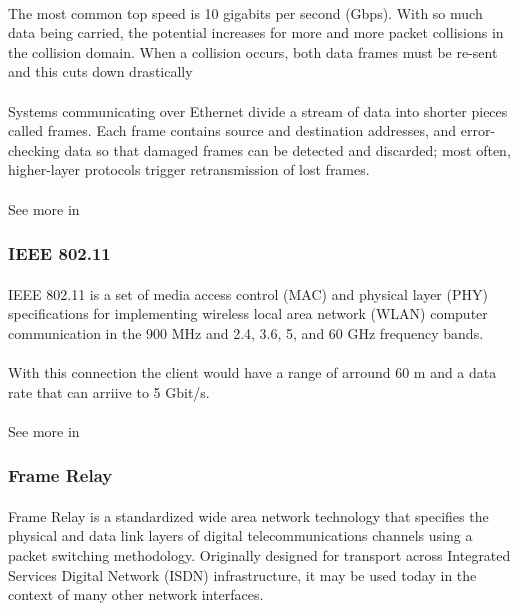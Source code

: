 \paragraph{}
The most common top speed is 10 gigabits per second (Gbps). With so much data being carried, the potential increases for more and more packet collisions in the collision domain. When a collision occurs, both data frames must be re-sent and this cuts down drastically 
\paragraph{}
Systems communicating over Ethernet divide a stream of data into shorter pieces called frames. Each frame contains source and destination addresses, and error-checking data so that damaged frames can be detected and discarded; most often, higher-layer protocols trigger retransmission of lost frames.
\paragraph{}
See more in \cite{Ethernet}

\subsubsection{IEEE 802.11}
\paragraph{}
IEEE 802.11 is a set of media access control (MAC) and physical layer (PHY) specifications for implementing wireless local area network (WLAN) computer communication in the 900 MHz and 2.4, 3.6, 5, and 60 GHz frequency bands. 
\paragraph{}
With this connection the client would have a range of arround 60 m and  a data rate that can arriive to 5 Gbit/s.
\paragraph{}
See more in \cite{80211}

\subsubsection{Frame Relay}
\paragraph{}
Frame Relay is a standardized wide area network technology that specifies the physical and data link layers of digital telecommunications channels using a packet switching methodology. Originally designed for transport across Integrated Services Digital Network (ISDN) infrastructure, it may be used today in the context of many other network interfaces.
